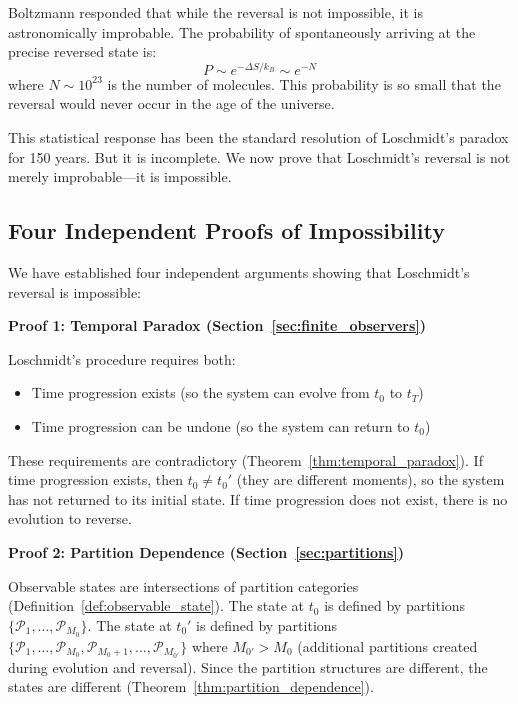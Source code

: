 \documentclass[twocolumn,10pt]{article}
\theoremstyle{definition}
\theoremstyle{remark}
\begin{document}
\vspace{0.2cm}
\noindent Boltzmann responded\cite{boltzmann1877} that while the reversal is not impossible, it is astronomically improbable. The probability of spontaneously arriving at the precise reversed state is:
\begin{equation}
P \sim e^{-\Delta S / k_B} \sim e^{-N}
\end{equation}
where $N \sim 10^{23}$ is the number of molecules. This probability is so small that the reversal would never occur in the age of the universe.

\vspace{0.2cm}
\noindent This statistical response has been the standard resolution of Loschmidt's paradox for 150 years. But it is incomplete. We now prove that Loschmidt's reversal is not merely improbable—it is impossible.

\subsection{Four Independent Proofs of Impossibility}

We have established four independent arguments showing that Loschmidt's reversal is impossible:

\vspace{0.2cm}
\noindent\textbf{Proof 1: Temporal Paradox (Section~\ref{sec:finite_observers})}

Loschmidt's procedure requires both:
\begin{itemize}
\item Time progression exists (so the system can evolve from $t_0$ to $t_T$)
\item Time progression can be undone (so the system can return to $t_0$)
\end{itemize}

These requirements are contradictory (Theorem~\ref{thm:temporal_paradox}). If time progression exists, then $t_0 \neq t_0'$ (they are different moments), so the system has not returned to its initial state. If time progression does not exist, there is no evolution to reverse.

\vspace{0.2cm}
\noindent\textbf{Proof 2: Partition Dependence (Section~\ref{sec:partitions})}

Observable states are intersections of partition categories (Definition~\ref{def:observable_state}). The state at $t_0$ is defined by partitions $\{\mathcal{P}_1, \ldots, \mathcal{P}_{M_0}\}$. The state at $t_0'$ is defined by partitions $\{\mathcal{P}_1, \ldots, \mathcal{P}_{M_0}, \mathcal{P}_{M_0+1}, \ldots, \mathcal{P}_{M_{0'}}\}$ where $M_{0'} > M_0$ (additional partitions created during evolution and reversal). Since the partition structures are different, the states are different (Theorem~\ref{thm:partition_dependence}).
\end{document}
